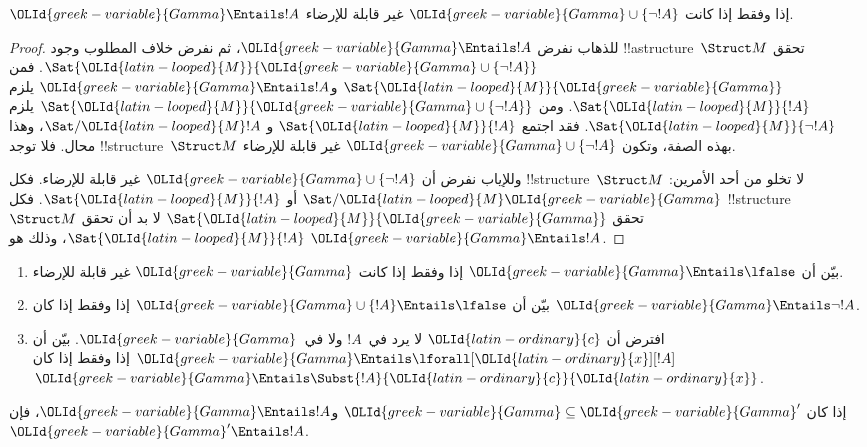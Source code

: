\documentclass[../../../include/open-logic-section]{subfiles}
\begin{document}
\begin{prop}
$\OLId{greek-variable}{Gamma} \Entails !A$ إذا وفقط إذا كانت
$\OLId{greek-variable}{Gamma} \cup \{\lnot !A\}$ غير قابلة للإرضاء.
\end{prop}

\begin{proof}
للذهاب نفرض $\OLId{greek-variable}{Gamma} \Entails !A$، ثم نفرض خلاف المطلوب وجود
!!a{structure}~$\Struct M$ تحقق
$\Sat{\OLId{latin-looped}{M}}{\OLId{greek-variable}{Gamma} \cup \{ \lnot !A \}}$. فمن
$\Sat{\OLId{latin-looped}{M}}{\OLId{greek-variable}{Gamma}}$ و$\OLId{greek-variable}{Gamma} \Entails !A$ يلزم $\Sat{\OLId{latin-looped}{M}}{!A}$.
ومن $\Sat{\OLId{latin-looped}{M}}{\OLId{greek-variable}{Gamma}\cup \{ \lnot !A \}}$ يلزم
$\Sat{\OLId{latin-looped}{M}}{\lnot !A}$. فقد اجتمع $\Sat{\OLId{latin-looped}{M}}{!A}$ و
$\Sat/{\OLId{latin-looped}{M}}{!A}$، وهذا محال. فلا توجد
!!{structure}~$\Struct M$ بهذه الصفة، وتكون
$\OLId{greek-variable}{Gamma} \cup \{ \lnot !A \}$ غير قابلة للإرضاء.

وللإياب نفرض أن $\OLId{greek-variable}{Gamma} \cup \{ \lnot !A \}$ غير قابلة للإرضاء.
فكل !!{structure}~$\Struct M$ لا تخلو من أحد الأمرين:
$\Sat/{\OLId{latin-looped}{M}}{\OLId{greek-variable}{Gamma}}$ أو $\Sat{\OLId{latin-looped}{M}}{!A}$. فكل !!{structure}
~$\Struct M$ تحقق $\Sat{\OLId{latin-looped}{M}}{\OLId{greek-variable}{Gamma}}$ لا بد أن تحقق $\Sat{\OLId{latin-looped}{M}}{!A}$،
وذلك هو $\OLId{greek-variable}{Gamma} \Entails !A$.
\end{proof}

\begin{prob}
\begin{enumerate}
\item بيّن أن $\OLId{greek-variable}{Gamma} \Entails \lfalse$ إذا وفقط إذا كانت $\OLId{greek-variable}{Gamma}$
  غير قابلة للإرضاء.
\item بيّن أن $\OLId{greek-variable}{Gamma} \cup \{!A\} \Entails \lfalse$ إذا وفقط إذا
  كان $\OLId{greek-variable}{Gamma} \Entails \lnot !A$.
\item افترض أن $\OLId{latin-ordinary}{c}$ لا يرد في~$!A$ ولا في~$\OLId{greek-variable}{Gamma}$. بيّن أن
  $\OLId{greek-variable}{Gamma} \Entails \lforall[\OLId{latin-ordinary}{x}][!A]$ إذا وفقط إذا كان
  $\OLId{greek-variable}{Gamma} \Entails \Subst{!A}{\OLId{latin-ordinary}{c}}{\OLId{latin-ordinary}{x}}$.
\end{enumerate}
\end{prob}

\begin{prop}
إذا كان $\OLId{greek-variable}{Gamma} \subseteq \OLId{greek-variable}{Gamma}'$ و$\OLId{greek-variable}{Gamma} \Entails !A$، فإن
$\OLId{greek-variable}{Gamma}' \Entails !A$.
\end{prop}
\end{document}
